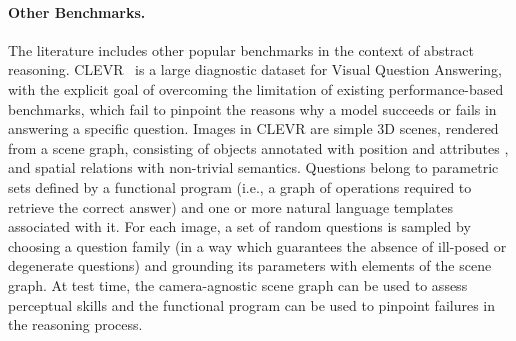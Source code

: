 \paragraph{Other Benchmarks.}
The literature includes other popular benchmarks in the context of abstract reasoning. %
CLEVR~\cite{johnson2017clevr} is a large diagnostic dataset for Visual Question Answering, with the explicit goal of overcoming the limitation of existing performance-based benchmarks, which fail to pinpoint the reasons why a model succeeds or fails in answering a specific question.
Images in CLEVR are simple 3D scenes, rendered from a scene graph, consisting of objects annotated with position %
and attributes%
, and spatial relations with non-trivial semantics. %
Questions belong to parametric sets defined by a functional program (i.e., a graph of operations required to retrieve the correct answer) and one or more natural language templates associated with it.
For each image, a set of random questions is sampled by choosing a question family (in a way which guarantees the absence of ill-posed or degenerate questions) and grounding its parameters with elements of the scene graph.
At test time, the camera-agnostic scene graph can be used to assess perceptual skills and the functional program can be used to pinpoint failures in the reasoning process.


